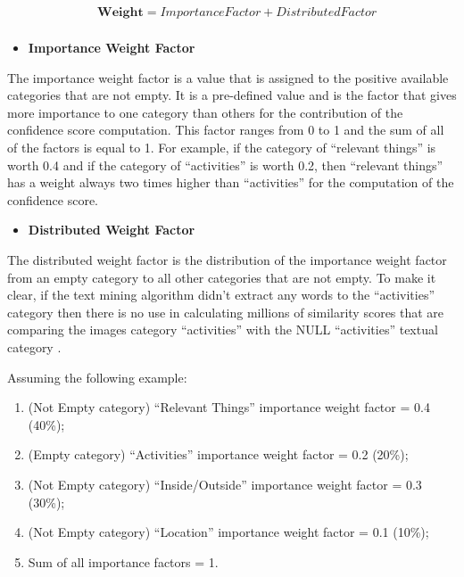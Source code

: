     \begin{align*}
      &\textbf{Weight}  =   ImportanceFactor + DistributedFactor \\ 
  \end{align*}

    \newpage
    \begin{itemize}
      \item \textbf{Importance Weight Factor}
    \end{itemize}

    The importance weight factor is a value that is assigned to the positive available categories that are not empty. It is a pre-defined value and is the factor that gives more importance to one category than others for the contribution of the confidence score computation. This factor ranges from 0 to 1 and the sum of all of the factors is equal to 1. For example, if the category of \enquote{relevant things} is worth 0.4 and if the category of \enquote{activities} is worth 0.2, then \enquote{relevant things} has a weight always two times higher than \enquote{activities} for the computation of the confidence score.

    \begin{itemize}
      \item \textbf{Distributed Weight Factor}
    \end{itemize}

    The distributed weight factor is the distribution of the importance weight factor from an empty category to all other categories that are not empty. To make it clear, if the text mining algorithm didn't extract any words to the \enquote{activities} category then there is no use in calculating millions of similarity scores that are comparing the images category \enquote{activities} with the NULL \enquote{activities} textual category . 

        
   Assuming the following example:
   \begin{enumerate}
    \item (Not Empty category) \enquote{Relevant Things} importance weight factor = 0.4 (40\%);
    \item (Empty category) \enquote{Activities} importance weight factor =  0.2 (20\%);
    \item (Not Empty category) \enquote{Inside/Outside} importance weight factor = 0.3 (30\%);
    \item (Not Empty category) \enquote{Location} importance weight factor = 0.1 (10\%);
    \item Sum of all importance factors = 1.
   \end{enumerate}

